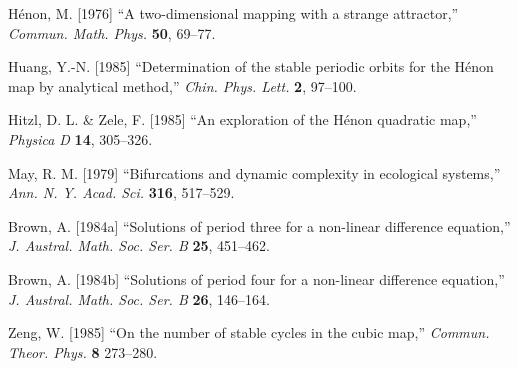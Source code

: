 \documentclass{ws-ijbc}
\begin{document}
\begin{thebibliography}{50}
  H\'enon, M. [1976]
  ``A two-dimensional mapping with a strange attractor,''
  {\it Commun. Math. Phys.}
  \textbf{50},
  69--77.

  Huang, Y.-N. [1985]
  ``Determination of the stable periodic orbits for the H\'enon map by analytical method,''
  {\it Chin. Phys. Lett.}
  \textbf{2},
  97--100.

  Hitzl, D. L. \& Zele, F. [1985]
  ``An exploration of the H\'enon quadratic map,''
  {\it Physica D}
  \textbf{14},
  305--326.

  May, R. M. [1979]
  ``Bifurcations and dynamic complexity in ecological systems,''
  {\it Ann. N. Y. Acad. Sci.}
  \textbf{316},
  517--529.

  Brown, A. [1984a]
  ``Solutions of period three for a non-linear difference equation,''
  {\it J. Austral. Math. Soc. Ser. B}
  \textbf{25},
  451--462.

  Brown, A. [1984b]
  ``Solutions of period four for a non-linear difference equation,''
  {\it J. Austral. Math. Soc. Ser. B}
  \textbf{26},
  146--164.

  Zeng, W. [1985]
  ``On the number of stable cycles in the cubic map,''
  {\it Commun. Theor. Phys.}
  \textbf{8}
  273--280.

\end{thebibliography}


\end{document}
